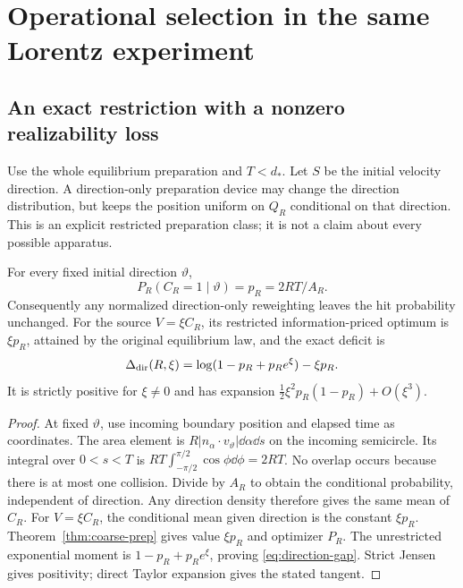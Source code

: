 \section{Operational selection in the same Lorentz experiment}\label{sec:operational}
\subsection{An exact restriction with a nonzero realizability loss}
Use the whole equilibrium preparation and $T<d_*$. Let $S$ be the initial velocity direction. A direction-only preparation device may change the direction distribution, but keeps the position uniform on $Q_R$ conditional on that direction. This is an explicit restricted preparation class; it is not a claim about every possible apparatus.

\begin{proposition}\label{prop:direction-prep}
For every fixed initial direction $\vartheta$,
\[
 P_R(C_R=1\mid\vartheta)=p_R=2RT/A_R.
\]
Consequently any normalized direction-only reweighting leaves the hit probability unchanged. For the source $V=\xi C_R$, its restricted information-priced optimum is $\xi p_R$, attained by the original equilibrium law, and the exact deficit is
\begin{equation}
 \Delta_{\rm dir}(R,\xi)
 =\log(1-p_R+p_Re^\xi)-\xi p_R.
 \label{eq:direction-gap}
\end{equation}
It is strictly positive for $\xi\ne0$ and has expansion
$\frac12\xi^2p_R(1-p_R)+O(\xi^3)$.
\end{proposition}
\begin{proof}
At fixed $\vartheta$, use incoming boundary position and elapsed time as coordinates. The area element is $R|n_\alpha\cdot v_\vartheta|\dd\alpha\dd s$ on the incoming semicircle. Its integral over $0<s<T$ is
$RT\int_{-\pi/2}^{\pi/2}\cos\phi\dd\phi=2RT$.
No overlap occurs because there is at most one collision. Divide by $A_R$ to obtain the conditional probability, independent of direction. Any direction density therefore gives the same mean of $C_R$. For $V=\xi C_R$, the conditional mean given direction is the constant $\xi p_R$. Theorem~\ref{thm:coarse-prep} gives value $\xi p_R$ and optimizer $P_R$. The unrestricted exponential moment is $1-p_R+p_Re^\xi$, proving \eqref{eq:direction-gap}. Strict Jensen gives positivity; direct Taylor expansion gives the stated tangent.
\end{proof}

